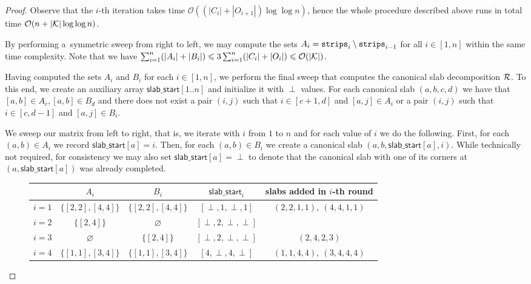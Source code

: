 \documentclass[runningheads]{llncs}
\newcommand{\Oh}{\mathcal{O}}
\renewcommand{\leq}{\leqslant}
\begin{document}
\begin{proof}
	Observe that the $i$-th iteration takes time $\Oh((|C_i|+|O_{i+1}|)\log \log n)$, hence the whole procedure described above runs in total time $\Oh(n+|{\cal K}|\log \log n)$.
	
	By performing a~symmetric sweep from right to left, we may compute the sets $A_i=\mathtt{strips}_i\setminus \mathtt{strips}_{i-1}$ for all $i\in [1,n]$ within the same time complexity. Note that we have $\sum_{i=1}^n (|A_i|+|B_i|)\leq 3\sum_{i=1}^n (|C_i|+|O_i|)\leq \Oh(|\cal K|)$.
	
	Having computed the sets $A_i$ and $B_i$ for each $i\in [1,n]$, we perform the final sweep that computes the canonical slab decomposition $\cal R$. To this end, we create an auxiliary array $\mathsf{slab\_start}[1..n]$ and initialize it with $\perp$ values. For each canonical slab $(a, b, c, d)$ we have that $[a, b] \in A_c, [a, b] \in B_d$ and there does not exist a pair $(i, j)$ such that $i \in [c+1, d]$ and $[a, j] \in A_i$ or a pair $(i, j)$ such that $i \in [c, d-1]$ and $[a, j] \in B_i$.
	
	We sweep our matrix from left to right, that is, we iterate with $i$ from $1$ to $n$ and for each value of $i$ we do the following.
	First, for each $(a, b) \in A_i$ we record $\mathsf{slab\_start}[a] = i$. Then, for each $(a, b) \in B_i$ we create a canonical slab $(a, b, \mathsf{slab\_start}[a], i)$. While technically not required, for consistency we may also set $\mathsf{slab\_start}[a] = \perp$ to denote that the canonical slab with one of its corners at $(a, \mathsf{slab\_start}[a])$ was already completed.
	
	
	

	\begin{figure}[h]
		\centering
			\begin{tabular}{|c|c|c|c|c|}
			\hline
			& $A_i$ & $B_i$ & $\mathsf{slab\_start}_i$ & slabs added in $i$-th round \\
			\hline
			$i=1$ & $\{[2,2], [4,4]\}$  & $\{[2,2], [4,4]\}$ & $[\perp, 1, \perp, 1]$ & $(2,2,1,1),\ (4,4,1,1)$\\
			\hline
			$i=2$ & $\{[2,4]\}$ &  $\varnothing$ & $[\perp, 2, \perp, \perp]$ & \\
			\hline
			$i=3$ & $\varnothing$ & $\{[2,4]\}$ & $[\perp, 2, \perp, \perp]$ & $(2,4, 2,3)$\\
			\hline
			$i=4$ & $\{[1,1], [3,4]\}$ & $\{[1,1], [3,4]\}$ & $[4, \perp, 4, \perp]$ & $(1,1,4,4),\ (3,4, 4,4)$\\
			\hline
		\end{tabular}
	

\end{figure}
\end{proof}
\end{document}

